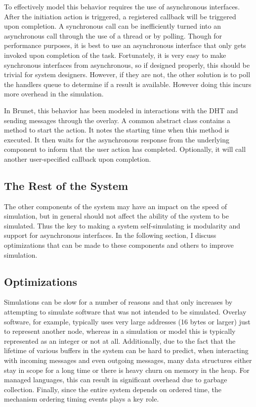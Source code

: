 To effectively model this behavior requires the use of asynchronous interfaces.
After the initiation action is triggered, a registered callback will be
triggered upon completion.  A synchronous call can be inefficiently turned into
an asynchronous call through the use of a thread or by polling.  Though for
performance purposes, it is best to use an asynchronous interface that only
gets invoked upon completion of the task.  Fortunately, it is very easy to make
synchronous interfaces from asynchronous, so if designed properly, this should
be trivial for system designers.  However, if they are not, the other solution
is to poll the handlers queue to determine if a result is available.  However
doing this incurs more overhead in the simulation.

In Brunet, this behavior has been modeled in interactions with the DHT and
sending messages through the overlay.  A common abstract class contains a
method to start the action.  It notes the starting time when this method is
executed.  It then waits for the asynchronous response from the underlying
component to inform that the user action has completed.  Optionally, it will
call another user-specified callback upon completion.

\subsection{The Rest of the System}

The other components of the system may have an impact on the speed of
simulation, but in general should not affect the ability of the system to be
simulated.  Thus the key to making a system self-simulating is modularity and
support for asynchronous interfaces.  In the following section, I discuss
optimizations that can be made to these components and others to improve
simulation.

\subsection{Optimizations}

Simulations can be slow for a number of reasons and that only increases by
attempting to simulate software that was not intended to be simulated.  Overlay
software, for example, typically uses very large addresses (16 bytes or larger)
just to represent another node, whereas in a simulation or model this is
typically represented as an integer or not at all.  Additionally, due to the
fact that the lifetime of various buffers in the system can be hard to predict,
when interacting with incoming messages and even outgoing messages, many data
structures either stay in scope for a long time or there is heavy churn on
memory in the heap.  For managed languages, this can result in significant
overhead due to garbage collection.  Finally, since the entire system depends
on ordered time, the mechanism ordering timing events plays a key role.


